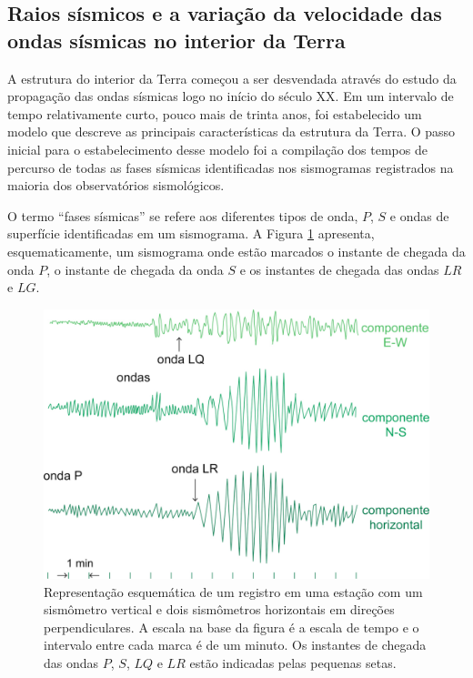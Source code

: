 \documentclass[]{book}
\theoremstyle{definition}
\theoremstyle{definition}
\theoremstyle{definition}
\theoremstyle{remark}
\begin{document}
\hypertarget{raios-sismicos-e-a-variacao-da-velocidade-das-ondas-sismicas-no-interior-da-terra}{%
\subsection{Raios sísmicos e a variação da velocidade das ondas sísmicas no interior da Terra}\label{raios-sismicos-e-a-variacao-da-velocidade-das-ondas-sismicas-no-interior-da-terra}}

A estrutura do interior da Terra começou a ser desvendada através do estudo da propagação das ondas sísmicas logo no início do século XX. Em um intervalo de tempo relativamente curto, pouco mais de trinta anos, foi estabelecido um modelo que descreve as principais características da estrutura da Terra. O passo inicial para o estabelecimento desse modelo foi a compilação dos tempos de percurso de todas as fases sísmicas identificadas nos sismogramas registrados na maioria dos observatórios sismológicos.

O termo ``fases sísmicas'' se refere aos diferentes tipos de onda, \(P\), \(S\) e ondas de superfície identificadas em um sismograma. A Figura \ref{fig:usp0411} apresenta, esquematicamente, um sismograma onde estão marcados o instante de chegada da onda \(P\), o instante de chegada da onda \(S\) e os instantes de chegada das ondas \(LR\) e \(LG\).

\begin{figure}

{\centering \includegraphics[width=0.7\linewidth]{fig/figU11} 

}

\caption{Representação esquemática de um registro em uma estação com um sismômetro vertical e dois sismômetros horizontais em direções perpendiculares. A escala na base da figura é a escala de tempo e o intervalo entre cada marca é de um minuto. Os instantes de chegada das ondas $P$, $S$, $LQ$ e $LR$ estão indicadas pelas pequenas setas.}\label{fig:usp0411}
\end{figure}
\end{document}
